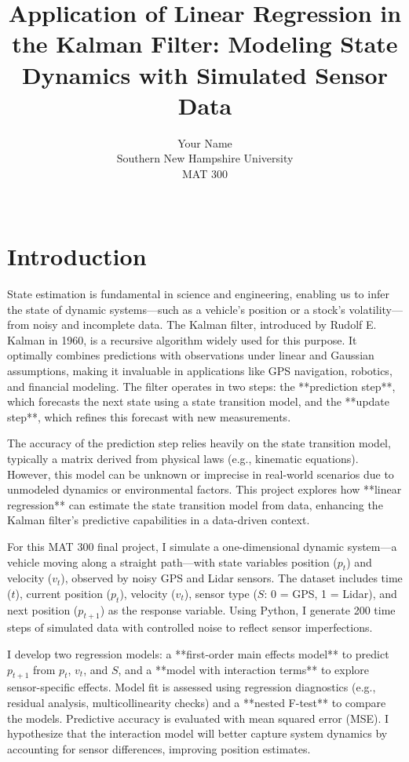 \documentclass[12pt]{article}
\title{Application of Linear Regression in the Kalman Filter: Modeling State Dynamics with Simulated Sensor Data}
\author{Your Name \\ Southern New Hampshire University \\ MAT 300 \\ [Course Instructor] \\ [Submission Date]}
\date{}
\begin{document}
\maketitle

\tableofcontents
\newpage

\section{Introduction}
\label{sec:intro}

State estimation is fundamental in science and engineering, enabling us to infer the state of dynamic systems—such as a vehicle’s position or a stock’s volatility—from noisy and incomplete data. The Kalman filter, introduced by Rudolf E. Kalman in 1960, is a recursive algorithm widely used for this purpose. It optimally combines predictions with observations under linear and Gaussian assumptions, making it invaluable in applications like GPS navigation, robotics, and financial modeling. The filter operates in two steps: the **prediction step**, which forecasts the next state using a state transition model, and the **update step**, which refines this forecast with new measurements.

The accuracy of the prediction step relies heavily on the state transition model, typically a matrix derived from physical laws (e.g., kinematic equations). However, this model can be unknown or imprecise in real-world scenarios due to unmodeled dynamics or environmental factors. This project explores how **linear regression** can estimate the state transition model from data, enhancing the Kalman filter’s predictive capabilities in a data-driven context.

For this MAT 300 final project, I simulate a one-dimensional dynamic system—a vehicle moving along a straight path—with state variables position (\( p_t \)) and velocity (\( v_t \)), observed by noisy GPS and Lidar sensors. The dataset includes time (\( t \)), current position (\( p_t \)), velocity (\( v_t \)), sensor type (\( S \): 0 = GPS, 1 = Lidar), and next position (\( p_{t+1} \)) as the response variable. Using Python, I generate 200 time steps of simulated data with controlled noise to reflect sensor imperfections.

I develop two regression models: a **first-order main effects model** to predict \( p_{t+1} \) from \( p_t \), \( v_t \), and \( S \), and a **model with interaction terms** to explore sensor-specific effects. Model fit is assessed using regression diagnostics (e.g., residual analysis, multicollinearity checks) and a **nested F-test** to compare the models. Predictive accuracy is evaluated with mean squared error (MSE). I hypothesize that the interaction model will better capture system dynamics by accounting for sensor differences, improving position estimates.
\end{document}
